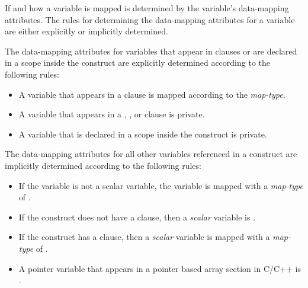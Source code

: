 If and how a variable is mapped is determined by the variable's data-mapping
attributes.  
The rules for determining the
data-mapping attributes for a variable are either explicitly or implicitly
determined.

The data-mapping attributes for variables that appear in clauses or are
declared in a scope inside the  construct are explicitly determined
according to the following rules: \begin{itemize}

  \item A variable that appears in a  clause is mapped according to
  the \emph{map-type}.

  \item A variable that appears in a , , or
   clause is private.

  \item A variable that is declared in a scope inside the 
  construct is private.

\end{itemize}

The data-mapping attributes for all other variables referenced in a
 construct are implicitly determined according to the following
rules: \begin{itemize}

  \item If the variable is not a scalar variable, the variable is mapped
  with a \emph{map-type} of .

  \item If the  construct does not have a
   clause, then a \emph{scalar} variable is
  .  

  \item If the  construct has a 
  clause, then a \emph{scalar} variable is mapped with a \emph{map-type} of
  .

  \item A pointer variable that appears in a pointer based array section in
  C/C++ is .

\end{itemize}

